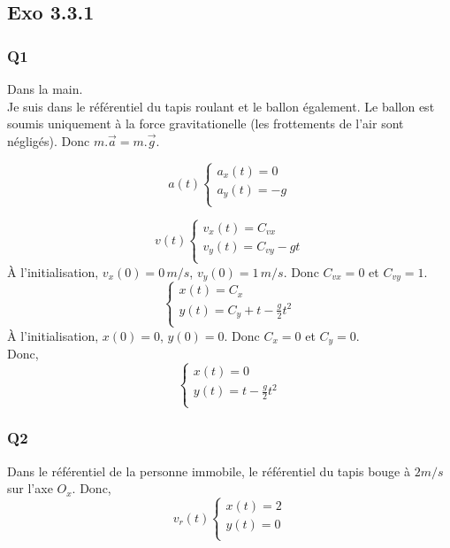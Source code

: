 \documentclass[]{book}
\theoremstyle{definition}
\begin{document}
\subsection*{Exo 3.3.1}
\subsubsection*{Q1}
Dans la main.\\

Je suis dans le r\'ef\'erentiel du tapis roulant et le ballon \'egalement. Le ballon est soumis uniquement \`a la force gravitationelle (les frottements de l'air sont n\'eglig\'es). Donc $m.\overrightarrow{a} = m.\overrightarrow{g}$.

$$a(t)
\left\{
\begin{array}{l}
 a_{x}(t) = 0 \\
 a_{y}(t) = -g \\
\end{array}
\right. 
$$

$$v(t)
\left\{
\begin{array}{l}
 v_{x}(t) =  C_{vx} \\
 v_{y}(t) =  C_{vy} -gt \\
\end{array}
\right. 
$$
\`A l'initialisation, $v_{x}(0) = 0\, m/s$, $v_{y}(0) = 1\, m/s$. Donc $C_{vx} = 0$ et $C_{vy} = 1$.\\

$$
\left\{
\begin{array}{l}
 x(t) =  C_{x} \\
 y(t) =  C_{y} + t -\frac{g}{2}t^2 \\
\end{array}
\right. 
$$
\`A l'initialisation, $x(0) = 0$, $y(0) = 0$. Donc $C_{x} = 0$ et $C_{y} = 0$.\\

Donc,
$$
\left\{
\begin{array}{l}
 x(t) =  0 \\
 y(t) =  t -\frac{g}{2}t^2 \\
\end{array}
\right. 
$$


\subsubsection*{Q2}
Dans le r\'ef\'erentiel de la personne immobile, le r\'ef\'erentiel du tapis bouge \`a $2m/s$ sur l'axe $O_x$. Donc, 
$$v_{r}(t)
\left\{
\begin{array}{l}
 x(t) =  2 \\
 y(t) =  0 \\
\end{array}
\right. 
$$
\end{document}
